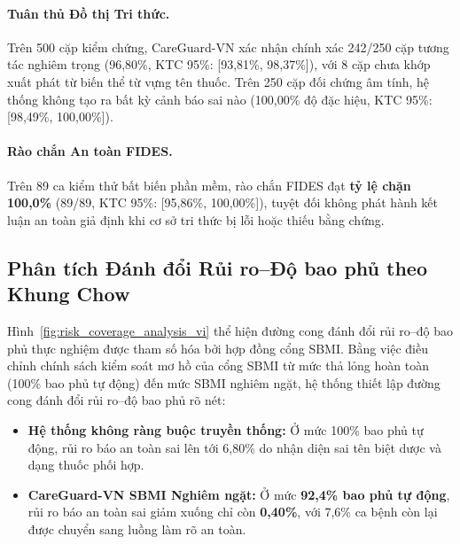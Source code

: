 \documentclass[11pt]{article}
\begin{document}
\paragraph{Tuân thủ Đồ thị Tri thức.}
Trên 500 cặp kiểm chứng, CareGuard-VN xác nhận chính xác 242/250 cặp tương tác nghiêm trọng (96,80\%, KTC 95\%: [93,81\%, 98,37\%]), với 8 cặp chưa khớp xuất phát từ biến thể từ vựng tên thuốc. Trên 250 cặp đối chứng âm tính, hệ thống không tạo ra bất kỳ cảnh báo sai nào (100,00\% độ đặc hiệu, KTC 95\%: [98,49\%, 100,00\%]).

\paragraph{Rào chắn An toàn FIDES.}
Trên 89 ca kiểm thử bất biến phần mềm, rào chắn FIDES đạt \textbf{tỷ lệ chặn 100,0\%} (89/89, KTC 95\%: [95,86\%, 100,00\%]), tuyệt đối không phát hành kết luận an toàn giả định khi cơ sở tri thức bị lỗi hoặc thiếu bằng chứng.

\subsection{Phân tích Đánh đổi Rủi ro--Độ bao phủ theo Khung Chow}
Hình~\ref{fig:risk_coverage_analysis_vi} thể hiện đường cong đánh đổi rủi ro--độ bao phủ thực nghiệm được tham số hóa bởi hợp đồng cổng SBMI. Bằng việc điều chỉnh chính sách kiểm soát mơ hồ của cổng SBMI từ mức thả lỏng hoàn toàn (100\% bao phủ tự động) đến mức SBMI nghiêm ngặt, hệ thống thiết lập đường cong đánh đổi rủi ro--độ bao phủ rõ nét:
\begin{itemize}
  \item \textbf{Hệ thống không ràng buộc truyền thống:} Ở mức 100\% bao phủ tự động, rủi ro báo an toàn sai lên tới 6,80\% do nhận diện sai tên biệt dược và dạng thuốc phối hợp.
  \item \textbf{CareGuard-VN SBMI Nghiêm ngặt:} Ở mức \textbf{92,4\% bao phủ tự động}, rủi ro báo an toàn sai giảm xuống chỉ còn \textbf{0,40\%}, với 7,6\% ca bệnh còn lại được chuyển sang luồng làm rõ an toàn.
\end{itemize}
\end{document}
